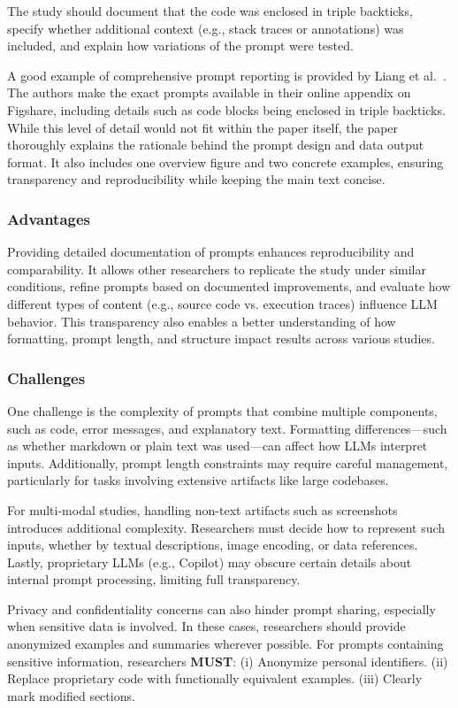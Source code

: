 The study should document that the code was enclosed in triple backticks, specify whether additional context (e.g., stack traces or annotations) was included, and explain how variations of the prompt were tested.

A good example of comprehensive prompt reporting is provided by Liang et al.~\cite{Liang2024}. The authors make the exact prompts available in their online appendix on Figshare, including details such as code blocks being enclosed in triple backticks. While this level of detail would not fit within the paper itself, the paper thoroughly explains the rationale behind the prompt design and data output format. It also includes one overview figure and two concrete examples, ensuring transparency and reproducibility while keeping the main text concise.

\subsubsection{Advantages}
Providing detailed documentation of prompts enhances reproducibility and comparability. It allows other researchers to replicate the study under similar conditions, refine prompts based on documented improvements, and evaluate how different types of content (e.g., source code vs. execution traces) influence LLM behavior. This transparency also enables a better understanding of how formatting, prompt length, and structure impact results across various studies.

\subsubsection{Challenges}
One challenge is the complexity of prompts that combine multiple components, such as code, error messages, and explanatory text. Formatting differences—such as whether markdown or plain text was used—can affect how LLMs interpret inputs. Additionally, prompt length constraints may require careful management, particularly for tasks involving extensive artifacts like large codebases.

For multi-modal studies, handling non-text artifacts such as screenshots introduces additional complexity. Researchers must decide how to represent such inputs, whether by textual descriptions, image encoding, or data references. Lastly, proprietary LLMs (e.g., Copilot) may obscure certain details about internal prompt processing, limiting full transparency.

Privacy and confidentiality concerns can also hinder prompt sharing, especially when sensitive data is involved. In these cases, researchers should provide anonymized examples and summaries wherever possible. For prompts containing sensitive information, researchers \textbf{MUST}: (i) Anonymize personal identifiers. (ii) Replace proprietary code with functionally equivalent examples. (iii) Clearly mark modified sections.

